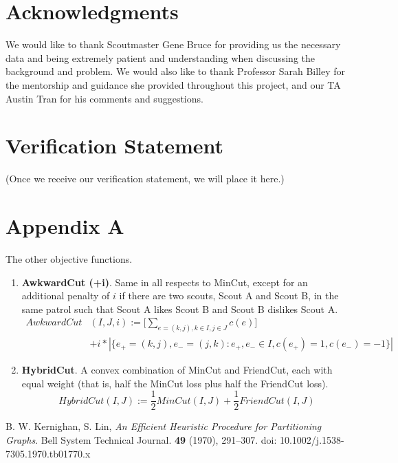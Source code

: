 \documentclass{amsart}
\theoremstyle{definition}
\theoremstyle{remark}
\numberwithin{equation}{section}
\begin{document}
\section*{Acknowledgments}
We would like to thank Scoutmaster Gene Bruce for providing us the necessary data and being extremely patient and understanding when discussing the background and problem. We would also like to thank Professor Sarah Billey for the mentorship and guidance she provided throughout this project, and our TA Austin Tran for his comments and suggestions. 

\section*{Verification Statement}
(Once we receive our verification statement, we will place it here.)

\section*{Appendix A}
The other objective functions.

\begin{enumerate}
    \item \textbf{AwkwardCut (+i)}. Same in all respects to MinCut, except for an additional penalty of $i$ if there are two scouts, Scout A and Scout B, in the same patrol such that Scout A likes Scout B and Scout B dislikes Scout A.
    \begin{equation*}
        \begin{split}
            AwkwardCut&(I, J, i) := \Bigg[ \sum_{e = (k, j), k \in I, j \in J}^{} c(e) \Bigg] \\
            &+ i * \left\vert{\{e_+ = (k,j), e_- = (j, k) : e_+, e_- \in I, c(e_+) = 1, c(e_-) = -1\}}\right\vert
        \end{split}
    \end{equation*}

\item \textbf{HybridCut}. A convex combination of MinCut and FriendCut, each with equal weight (that is, half the MinCut loss plus half the FriendCut loss).
    \begin{equation*}
        HybridCut(I, J) := \frac{1}{2}MinCut(I, J) + \frac{1}{2}FriendCut(I, J)
    \end{equation*}
\end{enumerate}



\begin{thebibliography}{10}

 B. W. Kernighan, S. Lin, \textit{An Efficient Heuristic Procedure for Partitioning Graphs}. Bell System Technical Journal. \textbf{49} (1970), 291--307. doi: 10.1002/j.1538-7305.1970.tb01770.x

\end{thebibliography}
\end{document}
